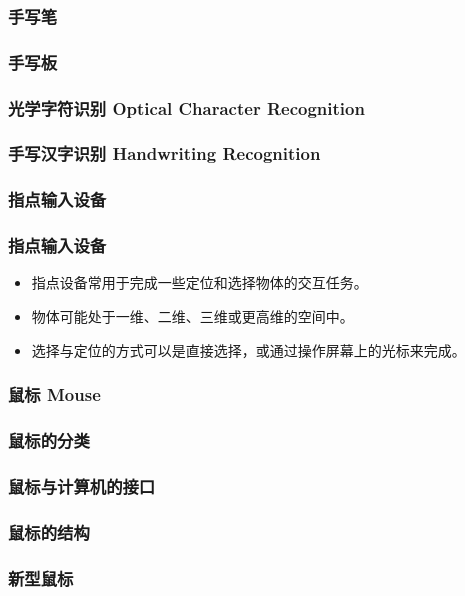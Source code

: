 \documentclass{beamer}
\begin{document}
\begin{frame}
	\frametitle{手写笔}

\end{frame}

\begin{frame}
	\frametitle{手写板}

\end{frame}

\begin{frame}
	\frametitle{光学字符识别 Optical Character Recognition}

\end{frame}

\begin{frame}
	\frametitle{手写汉字识别 Handwriting Recognition}

\end{frame}

\subsubsection{指点输入设备}
\begin{frame}
	\frametitle{指点输入设备}
	\begin{itemize}
		\item 指点设备常用于完成一些定位和选择物体的交互任务。
		\item 物体可能处于一维、二维、三维或更高维的空间中。
		\item 选择与定位的方式可以是直接选择，或通过操作屏幕上的光标来完成。
	\end{itemize}
\end{frame}

\begin{frame}
	\frametitle{鼠标 Mouse}

\end{frame}

\begin{frame}
	\frametitle{鼠标的分类}

\end{frame}

\begin{frame}
	\frametitle{鼠标与计算机的接口}

\end{frame}

\begin{frame}
	\frametitle{鼠标的结构}

\end{frame}

\begin{frame}
	\frametitle{新型鼠标}

\end{frame}
\end{document}

